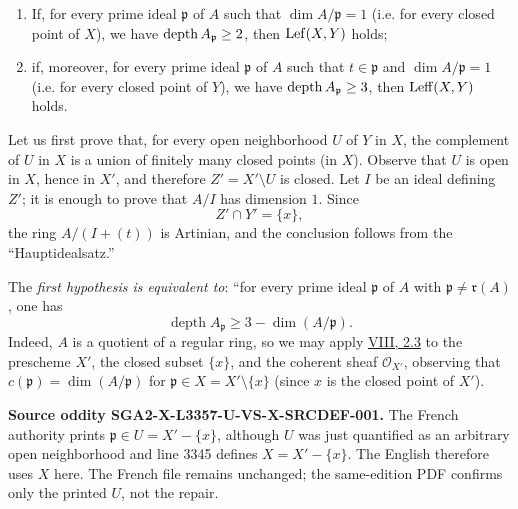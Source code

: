 \begin{enumerate}[label=(\roman*),leftmargin=2.5em]
\item If, for every prime ideal $\mathfrak p$ of $A$ such that
$\dim A/\mathfrak p=1$ (i.e. for every closed point of $X$), we have
$\operatorname{depth} A_{\mathfrak p}\geq 2$, then $\operatorname{Lef}(X,Y)$ holds;

\item if, moreover, for every prime ideal $\mathfrak p$ of $A$ such that
$t\in\mathfrak p$ and $\dim A/\mathfrak p=1$ (i.e. for every closed point
of $Y$), we have $\operatorname{depth} A_{\mathfrak p}\geq 3$, then $\operatorname{Leff}(X,Y)$
holds.
\end{enumerate}

Let us first prove that, for every open neighborhood $U$ of $Y$ in $X$, the
complement of $U$ in $X$ is a union of finitely many closed points (in $X$).
Observe that $U$ is open in $X$, hence in $X'$, and therefore
$Z'=X'\setminus U$ is closed. Let $I$ be an ideal defining $Z'$; it is
enough to prove that $A/I$ has dimension $1$. Since
\[
  Z'\cap Y'=\{x\},
\]
the ring $A/(I+(t))$ is Artinian, and the conclusion follows from the
``Hauptidealsatz.''

The \emph{first hypothesis is equivalent to}: ``for every prime ideal
$\mathfrak p$ of $A$ with $\mathfrak p\ne\mathfrak r(A)$, one has
\[
  \operatorname{depth} A_{\mathfrak p}
  \geq 3-\dim(A/\mathfrak p).
\]
Indeed, $A$ is a quotient of a regular ring, so we may apply \hyperref[VIII.2.3]{VIII, 2.3} to
the prescheme $X'$, the closed subset $\{x\}$, and the coherent sheaf
$\mathcal O_{X'}$, observing that
$c(\mathfrak p)=\dim(A/\mathfrak p)$ for
$\mathfrak p\in X=X'\setminus\{x\}$ (since $x$ is the closed point of
$X'$).

\medskip
\noindent\colorbox{noteblue}{\parbox{0.95\linewidth}{\footnotesize
\textbf{Source oddity SGA2-X-L3357-U-VS-X-SRCDEF-001.}
The French authority prints $\mathfrak p\in U=X'-\{x\}$, although $U$ was
just quantified as an arbitrary open neighborhood and line 3345 defines
$X=X'-\{x\}$. The English therefore uses $X$ here. The French file remains
unchanged; the same-edition PDF confirms only the printed $U$, not the
repair.}}

